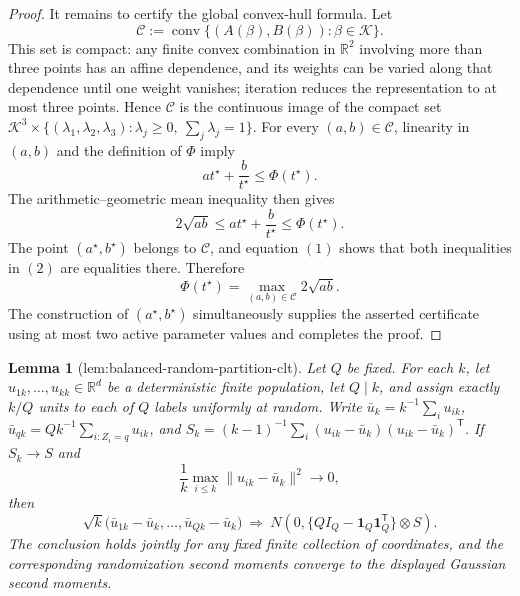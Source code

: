 \documentclass{article}
\newtheorem{lemma}{Lemma}
\begin{document}
\begin{proof}
It remains to certify the global convex-hull formula.  Let
\[
 \mathcal C:=\operatorname{conv}
 \{(A(\beta),B(\beta)):\beta\in\mathcal K\}.
\]
This set is compact: any finite convex combination in \(\mathbb R^2\) involving more than three points has an affine dependence, and its weights can be varied along that dependence until one weight vanishes; iteration reduces the representation to at most three points.  Hence \(\mathcal C\) is the continuous image of the compact set \(\mathcal K^3\times\{(\lambda_1,\lambda_2,\lambda_3):\lambda_j\ge0,\ \sum_j\lambda_j=1\}\).  For every \((a,b)\in\mathcal C\), linearity in \((a,b)\) and the definition of \(\Phi\) imply
\[
 at^\star+\frac{b}{t^\star}\le\Phi(t^\star).
\]
The arithmetic--geometric mean inequality then gives
\[
 2\sqrt{ab}
 \le at^\star+\frac{b}{t^\star}
 \le\Phi(t^\star).
\tag{2}
\]
The point \((a^\star,b^\star)\) belongs to \(\mathcal C\), and equation \((1)\) shows that both inequalities in \((2)\) are equalities there.  Therefore
\[
 \Phi(t^\star)
 =\max_{(a,b)\in\mathcal C}2\sqrt{ab}.
\]
The construction of \((a^\star,b^\star)\) simultaneously supplies the asserted certificate using at most two active parameter values and completes the proof.
\end{proof}

\begin{lemma}[lem:balanced-random-partition-clt]\label{lem:balanced-random-partition-clt}
Let \(Q\) be fixed.  For each \(k\), let \(u_{1k},\ldots,u_{kk}\in\mathbb R^d\) be a deterministic finite population, let \(Q\mid k\), and assign exactly \(k/Q\) units to each of \(Q\) labels uniformly at random.  Write \(\bar u_k=k^{-1}\sum_i u_{ik}\), \(\bar u_{qk}=Qk^{-1}\sum_{i:Z_i=q}u_{ik}\), and \(S_k=(k-1)^{-1}\sum_i(u_{ik}-\bar u_k)(u_{ik}-\bar u_k)^{\mathsf T}\).  If \(S_k\to S\) and
\[
\frac{1}{k}\max_{i\leq k}\lVert u_{ik}-\bar u_k\rVert^2\longrightarrow0,
\]
then
\[
\sqrt{k}\bigl(\bar u_{1k}-\bar u_k,\ldots,\bar u_{Qk}-\bar u_k\bigr)
\ \Rightarrow\
N\!\left(0,\{QI_Q-\mathbf 1_Q\mathbf 1_Q^{\mathsf T}\}\otimes S\right).
\]
The conclusion holds jointly for any fixed finite collection of coordinates, and the corresponding randomization second moments converge to the displayed Gaussian second moments.
\end{lemma}
\end{document}
